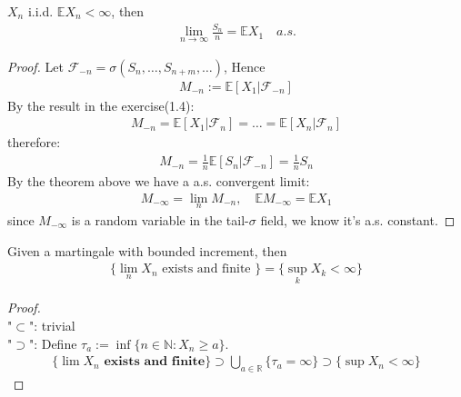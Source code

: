 \begin{example}
$X_n$ i.i.d. $\mathbb{E}X_n < \infty$, then
\begin{align*}
	\lim_{n \rightarrow \infty} \frac{S_n}{n}  = \mathbb{E}X_1 \quad a.s.
\end{align*}

\end{example}
\begin{proof}
	Let $\mathcal{F}_{-n} = \sigma(S_{n}, \dots, S_{n + m}, \dots)$, 
	Hence
	\begin{align*}
		M_{-n} := \mathbb{E}[X_1|\mathcal{F}_{-n}]
	\end{align*}
	By the result in the exercise(1.4):
	\begin{align*}
		M_{-n} = \mathbb{E}[X_1|\mathcal{F}_n] = \dots =\mathbb{E}[X_n |\mathcal{F}_n]
	\end{align*}
	therefore:
	\begin{align*}
		M_{-n} = \frac{1}{n}\mathbb{E}[S_n|\mathcal{F}_{-n}] = \frac{1}{n}S_n
	\end{align*}
	By the theorem above we have a a.s. convergent limit:
	\begin{align*}
		M_{-\infty} = \lim_{n} M_{-n}, \quad \mathbb{E}M_{-\infty} = \mathbb{E}X_1 
	\end{align*}
	since $M_{-\infty}$ is a random variable in the tail-$\sigma$ field, we know it's a.s. constant.
\end{proof}



\begin{example}
	
\end{example}


\begin{lemma}
	Given a martingale with bounded increment, then
\begin{align*}
	\{\lim_n X_n \text{ exists and finite }\} = \{\sup_k X_k < \infty\}
\end{align*}
\end{lemma}
\begin{proof}\quad\\
"$\subset$": trivial\\
"$\supset$": Define $\tau_a:= \inf \{n \in \mathbb{N}: X_n \geq a\}$. 
\begin{align*}
	\{ \lim X_n \textbf{ exists and finite} \} \supset \bigcup_{a \in \mathbb{R}} \{\tau_a = \infty\} \supset \{\sup X_n < \infty \}
\end{align*}
\end{proof}

